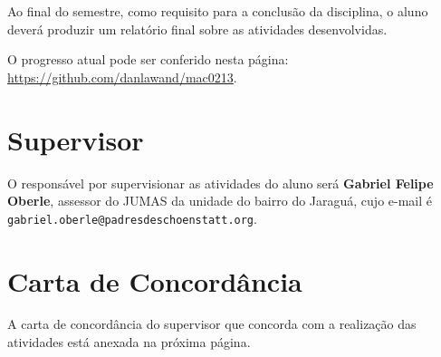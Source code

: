 \documentclass{article}
\begin{document}
Ao final do semestre, como requisito para a conclusão da disciplina, o aluno deverá produzir um relatório final sobre as atividades desenvolvidas.

O progresso atual pode ser conferido nesta página: \url{https://github.com/danlawand/mac0213}.

\section{Supervisor}

O responsável por supervisionar as atividades do aluno  será \textbf{Gabriel Felipe Oberle}, assessor do JUMAS da unidade do bairro do Jaraguá, cujo e-mail é \texttt{gabriel.oberle@padresdeschoenstatt.org}.

\section{Carta de Concordância}

A carta de concordância do supervisor que concorda com a realização das atividades está anexada na próxima página.

% 
\end{document}
